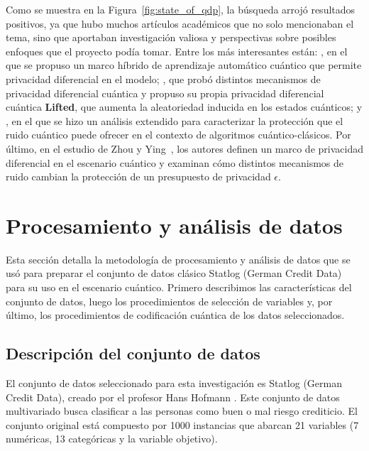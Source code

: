 \documentclass{ieeeaccess}
\begin{document}
Como se muestra en la Figura~\ref{fig:state_of_qdp}, la búsqueda arrojó resultados positivos, ya que hubo muchos artículos académicos que no solo mencionaban el tema, sino que aportaban investigación valiosa y perspectivas sobre posibles enfoques que el proyecto podía tomar. Entre los más interesantes están: \cite{watkins2023quantum}, en el que se propuso un marco híbrido de aprendizaje automático cuántico que permite privacidad diferencial en el modelo; \cite{song2025hybrid}, que probó distintos mecanismos de privacidad diferencial cuántica y propuso su propia privacidad diferencial cuántica \textbf{Lifted}, que aumenta la aleatoriedad inducida en los estados cuánticos; y \cite{yang2023improved}, en el que se hizo un análisis extendido para caracterizar la protección que el ruido cuántico puede ofrecer en el contexto de algoritmos cuántico-clásicos. Por último, en el estudio de Zhou y Ying~\cite{zhou2017differential}, los autores definen un marco de privacidad diferencial en el escenario cuántico y examinan cómo distintos mecanismos de ruido cambian la protección de un presupuesto de privacidad $\epsilon$.

\section{Procesamiento y análisis de datos}
\label{sec:data_processing_and_analysis}

Esta sección detalla la metodología de procesamiento y análisis de datos que se usó para preparar el conjunto de datos clásico Statlog (German Credit Data)~\cite{hofmann1994german, germancredit2026} para su uso en el escenario cuántico. Primero describimos las características del conjunto de datos, luego los procedimientos de selección de variables y, por último, los procedimientos de codificación cuántica de los datos seleccionados.

\subsection{Descripción del conjunto de datos}

El conjunto de datos seleccionado para esta investigación es Statlog (German Credit Data), creado por el profesor Hans Hofmann \cite{hofmann1994german}. Este conjunto de datos multivariado busca clasificar a las personas como buen o mal riesgo crediticio. El conjunto original está compuesto por 1000 instancias que abarcan 21 variables (7 numéricas, 13 categóricas y la variable objetivo).
\end{document}
